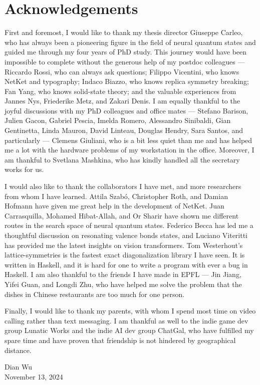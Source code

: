 \chapter*{Acknowledgements}

First and foremost, I would like to thank my thesis director Giuseppe Carleo, who has always been a pioneering figure in the field of neural quantum states and guided me through my four years of PhD study.
This journey would have been impossible to complete without the generous help of my postdoc colleagues --- Riccardo Rossi, who can always ask questions; Filippo Vicentini, who knows NetKet and typography; Indaco Biazzo, who knows replica symmetry breaking; Fan Yang, who knows solid-state theory; and the valuable experiences from Jannes Nys, Friederike Metz, and Zakari Denis.
I am equally thankful to the joyful discussions with my PhD colleagues and office mates --- Stefano Barison, Julien Gacon, Gabriel Pescia, Imelda Romero, Alessandro Sinibaldi, Gian Gentinetta, Linda Mauron, David Linteau, Douglas Hendry, Sara Santos, and particularly --- Clemens Giuliani, who is a bit less quiet than me and has helped me a lot with the hardware problems of my workstation in the office.
Moreover, I am thankful to Svetlana Mashkina, who has kindly handled all the secretary works for us.

I would also like to thank the collaborators I have met, and more researchers from whom I have learned.
Attila Szabó, Christopher Roth, and Damian Hofmann have given me great help in the development of NetKet.
Juan Carrasquilla, Mohamed Hibat-Allah, and Or Sharir have shown me different routes in the search space of neural quantum states.
Federico Becca has led me a thoughtful discussion on resonating valence bonds states, and Luciano Viteritti has provided me the latest insights on vision transformers.
Tom Westerhout's lattice-symmetries is the fastest exact diagonalization library I have seen. It is written in Haskell, and it is hard for one to write a program with ever a bug in Haskell.
I am also thankful to the friends I have made in EPFL --- Jin Jiang, Yifei Guan, and Longdi Zhu, who have helped me solve the problem that the dishes in Chinese restaurants are too much for one person.

Finally, I would like to thank my parents, with whom I spend most time on video calling rather than text messaging.
I am thankful as well to the indie game dev group Lunatic Works and the indie AI dev group ChatGal, who have fulfilled my spare time and have proven that friendship is not hindered by geographical distance.

\begin{flushright}
Dian Wu \\
November 13, 2024
\end{flushright}
